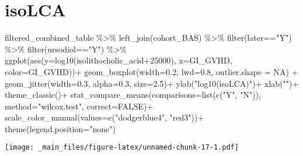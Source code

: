 \documentclass[
]{book}
\newenvironment{Shaded}{\begin{snugshade}}{\end{snugshade}}
\newcommand{\AttributeTok}[1]{\textcolor[rgb]{0.77,0.63,0.00}{#1}}
\newcommand{\ConstantTok}[1]{\textcolor[rgb]{0.00,0.00,0.00}{#1}}
\newcommand{\DecValTok}[1]{\textcolor[rgb]{0.00,0.00,0.81}{#1}}
\newcommand{\FloatTok}[1]{\textcolor[rgb]{0.00,0.00,0.81}{#1}}
\newcommand{\FunctionTok}[1]{\textcolor[rgb]{0.00,0.00,0.00}{#1}}
\newcommand{\NormalTok}[1]{#1}
\newcommand{\SpecialCharTok}[1]{\textcolor[rgb]{0.00,0.00,0.00}{#1}}
\newcommand{\StringTok}[1]{\textcolor[rgb]{0.31,0.60,0.02}{#1}}
\begin{document}
\hypertarget{isolca}{%
\section{isoLCA}\label{isolca}}

\begin{Shaded}
\begin{Highlighting}[]
\NormalTok{filtered\_combined\_table }\SpecialCharTok{\%\textgreater{}\%} 
  \FunctionTok{left\_join}\NormalTok{(cohort\_BAS) }\SpecialCharTok{\%\textgreater{}\%} 
  \FunctionTok{filter}\NormalTok{(later}\SpecialCharTok{==}\StringTok{"Y"}\NormalTok{) }\SpecialCharTok{\%\textgreater{}\%} 
  \FunctionTok{filter}\NormalTok{(ursodiol}\SpecialCharTok{==}\StringTok{"Y"}\NormalTok{) }\SpecialCharTok{\%\textgreater{}\%} 
  \FunctionTok{ggplot}\NormalTok{(}\FunctionTok{aes}\NormalTok{(}\AttributeTok{y=}\FunctionTok{log10}\NormalTok{(isolithocholic\_acid}\SpecialCharTok{+}\DecValTok{25000}\NormalTok{), }\AttributeTok{x=}\NormalTok{GI\_GVHD, }\AttributeTok{color=}\NormalTok{GI\_GVHD))}\SpecialCharTok{+}
  \FunctionTok{geom\_boxplot}\NormalTok{(}\AttributeTok{width=}\FloatTok{0.2}\NormalTok{, }\AttributeTok{lwd=}\FloatTok{0.8}\NormalTok{, }\AttributeTok{outlier.shape =} \ConstantTok{NA}\NormalTok{) }\SpecialCharTok{+}
  \FunctionTok{geom\_jitter}\NormalTok{(}\AttributeTok{width=}\FloatTok{0.3}\NormalTok{, }\AttributeTok{alpha=}\FloatTok{0.3}\NormalTok{, }\AttributeTok{size=}\FloatTok{2.5}\NormalTok{)}\SpecialCharTok{+}
  \FunctionTok{ylab}\NormalTok{(}\StringTok{"log10(isoLCA)"}\NormalTok{)}\SpecialCharTok{+}
  \FunctionTok{xlab}\NormalTok{(}\StringTok{""}\NormalTok{)}\SpecialCharTok{+}
  \FunctionTok{theme\_classic}\NormalTok{()}\SpecialCharTok{+}
  \FunctionTok{stat\_compare\_means}\NormalTok{(}\AttributeTok{comparisons=}\FunctionTok{list}\NormalTok{(}\FunctionTok{c}\NormalTok{(}\StringTok{"Y"}\NormalTok{, }\StringTok{"N"}\NormalTok{)),}
                     \AttributeTok{method=}\StringTok{"wilcox.test"}\NormalTok{,}
                     \AttributeTok{correct=}\ConstantTok{FALSE}\NormalTok{)}\SpecialCharTok{+}
  \FunctionTok{scale\_color\_manual}\NormalTok{(}\AttributeTok{values=}\FunctionTok{c}\NormalTok{(}\StringTok{"dodgerblue4"}\NormalTok{, }\StringTok{"red3"}\NormalTok{))}\SpecialCharTok{+}
  \FunctionTok{theme}\NormalTok{(}\AttributeTok{legend.position=}\StringTok{"none"}\NormalTok{)}
\end{Highlighting}
\end{Shaded}

\texttt{[image: \_main\_files/figure-latex/unnamed-chunk-17-1.pdf]}
\end{document}
